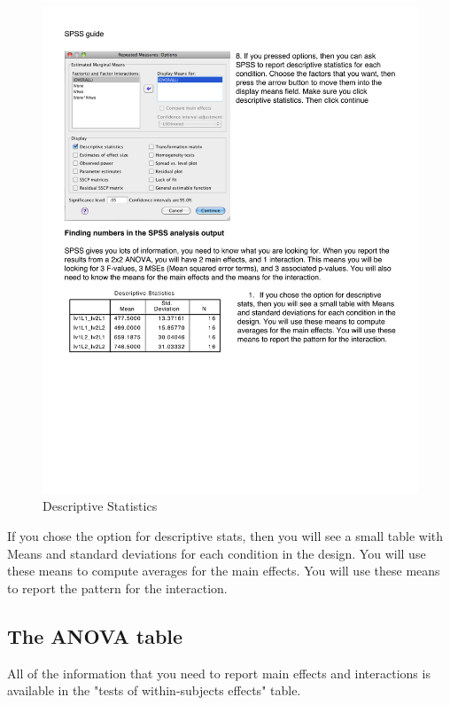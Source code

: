 \begin{figure}
      \includegraphics[width=\linewidth]{LabmanualFigures/SPSS12.pdf}
      \caption{Descriptive Statistics}
      \label{fig:SPSS12}
\end{figure}

If you chose the option for descriptive stats, then you will see a small table with Means and standard deviations for each condition in the design. You will use these means to compute averages for the main effects. You will use these means to report the pattern for the interaction.

\subsection{The ANOVA table}
All of the information that you need to report main effects and interactions is available in  the "tests of within-subjects effects" table.

